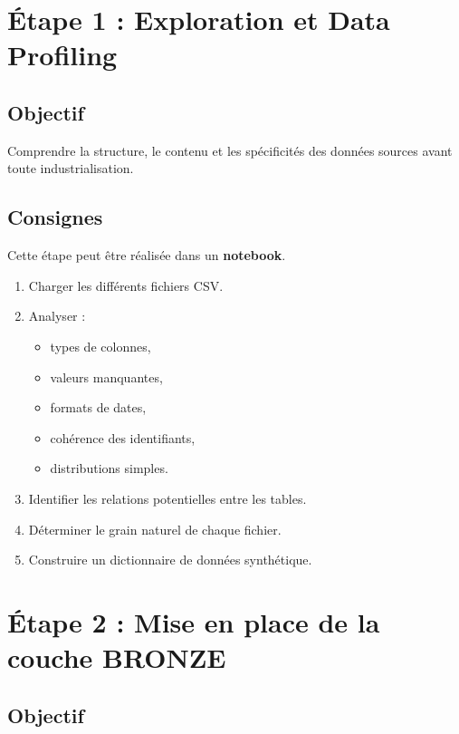\documentclass[11pt,a4paper]{article}
\begin{document}
\section{Étape 1 : Exploration et Data Profiling}

\subsection*{Objectif}

Comprendre la structure, le contenu et les spécificités des données sources
avant toute industrialisation.

\subsection*{Consignes}

Cette étape peut être réalisée dans un \textbf{notebook}.

\begin{enumerate}
  \item Charger les différents fichiers CSV.
  \item Analyser :
  \begin{itemize}
    \item types de colonnes,
    \item valeurs manquantes,
    \item formats de dates,
    \item cohérence des identifiants,
    \item distributions simples.
  \end{itemize}
  \item Identifier les relations potentielles entre les tables.
  \item Déterminer le grain naturel de chaque fichier.
  \item Construire un dictionnaire de données synthétique.
\end{enumerate}



\section{Étape 2 : Mise en place de la couche BRONZE}

\subsection*{Objectif}
\end{document}
